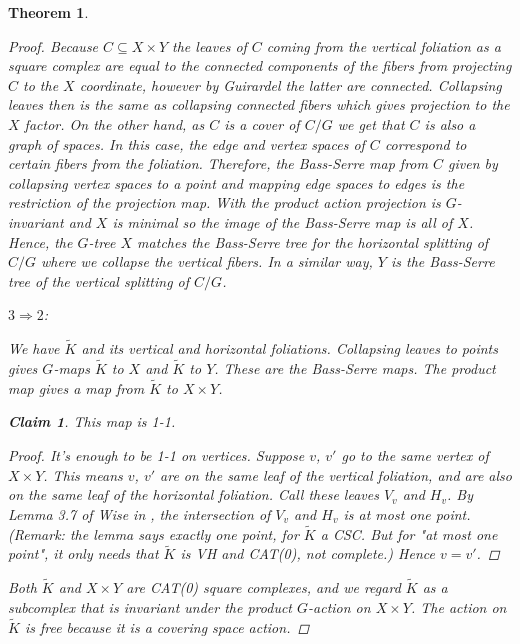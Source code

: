 \documentclass[12pt,parskip=full]{report}
\theoremstyle{plain}
\newtheorem{thm}{Theorem}[section]
\theoremstyle{definition}
\newtheorem*{claim*}{Claim}
\begin{document}
\begin{thm}
\begin{proof}
    Because $C\subseteq X\times Y$ the leaves of $C$ coming from the vertical foliation as a square complex are equal to the connected components of the fibers from projecting $C$ to the $X$ coordinate, however by Guirardel the latter are connected. Collapsing leaves then is the same as collapsing connected fibers which gives projection to the $X$ factor. On the other hand, as \(C\) is a cover of \(C/G\) we get that \(C\) is also a graph of spaces. In this case, the edge and vertex spaces of \(C\) correspond to certain fibers from the foliation. Therefore, the Bass-Serre map from \(C\) given by collapsing vertex spaces to a point and mapping edge spaces to edges is the restriction of the projection map. With the product action projection is \(G\)-invariant and \(X\) is minimal so the image of the Bass-Serre map is all of \(X\). Hence, the \(G\)-tree \(X\) matches the Bass-Serre tree for the horizontal splitting of \(C/G\) where we collapse the vertical fibers. In a similar way, \(Y\) is the Bass-Serre tree of the vertical splitting of \(C/G\).
    
    
\item $3\Rightarrow 2$: 

    We have \(\widetilde K\) and its vertical and horizontal foliations. Collapsing
leaves to points gives \(G\)-maps \(\widetilde K\) to \(X\) and \(\widetilde K\) to \(Y\). These are the
Bass-Serre maps. The product map gives a map from \(\widetilde K\) to \(X\times Y\).

\begin{claim*} This map is 1-1.
\begin{proof}

It's enough to be 1-1 on vertices. Suppose \(v\), \(v'\) go to the same
vertex of \(X\times Y\). This means \(v\), \(v'\) are on the same leaf of the vertical foliation, and are also on the same leaf of the horizontal foliation.
Call these leaves \(V_v\) and \(H_v\).
By Lemma 3.7 of Wise in \cite{wisecsc}, the intersection of \(V_v\) and \(H_v\) is at most
one point. (Remark: the lemma says exactly one point, for \(\widetilde K\) a CSC.
But for "at most one point", it only needs that \(\widetilde K\) is VH and CAT(0),
not complete.) Hence \(v = v'\).
\end{proof}
\end{claim*}

Both \(\widetilde K\) and \(X\times Y\) are CAT(0) square complexes, and we regard \(\widetilde K\) as a
subcomplex that is invariant under the product \(G\)-action on \(X\times Y\). The
action on \(\widetilde K\) is free because it is a covering space action.


\end{proof}
\end{thm}
\end{document}
